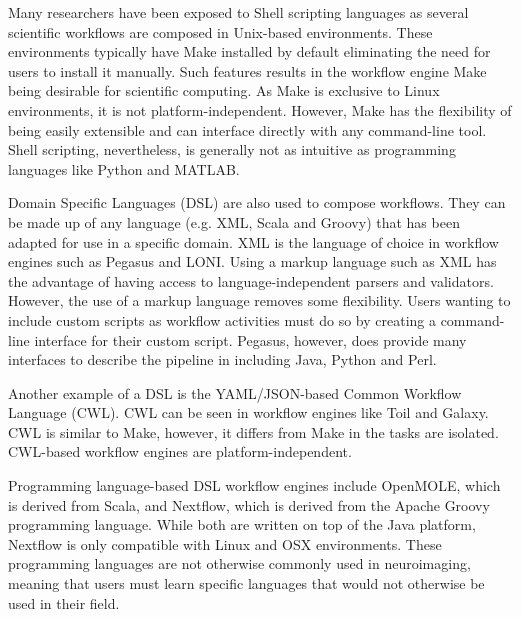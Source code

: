             Many researchers have been exposed to Shell scripting languages as
            several scientific workflows are composed in Unix-based
            environments. These environments typically have Make installed by
            default eliminating the need for users to install it manually. Such
            features results in the workflow engine Make being desirable for scientific
            computing. As Make is exclusive to Linux environments, it is not
            platform-independent. However, Make has the flexibility of being
            easily extensible and can interface directly with any command-line
            tool. Shell scripting, nevertheless, is generally not as intuitive
            as programming languages like Python and MATLAB.

            Domain Specific Languages (DSL) are also used to compose workflows.
            They can be made up of any language (e.g. XML, Scala and Groovy)
            that has been adapted for use in a specific domain. XML is the
            language of choice in  
            workflow engines such as Pegasus and LONI. Using a markup language
            such as XML has the advantage of having access to
            language-independent parsers and validators. However, the use of a
            markup language removes some flexibility. Users wanting to
            include custom scripts as workflow activities must do so by creating
            a command-line interface for their custom script. Pegasus, however,
            does provide many interfaces to describe the pipeline in including
            Java, Python and Perl.

            Another example of a DSL is the YAML/JSON-based Common Workflow
            Language (CWL). CWL can be seen in workflow engines like Toil and
            Galaxy. CWL is similar to Make, however, it differs from Make in the
            tasks are isolated. CWL-based workflow engines are
            platform-independent. 

            Programming language-based DSL workflow engines include OpenMOLE,
            which is  
            derived from Scala, and Nextflow, which is derived from the Apache
            Groovy programming language. While both are written on top of the
            Java platform, Nextflow is only compatible with Linux and OSX
            environments. These programming languages are not otherwise commonly
            used in neuroimaging, meaning that users must learn specific
            languages that would not otherwise be used in their field.

